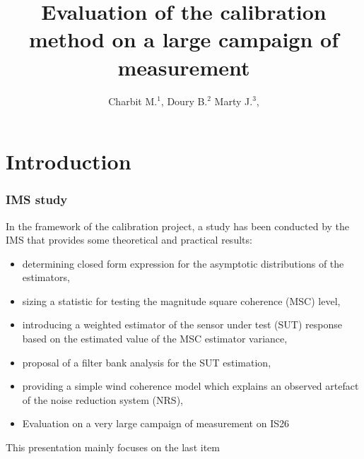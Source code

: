 \documentclass[handout,10pt]{beamer}
\title{Evaluation of the calibration method on a large campaign of measurement}
\author{
 Charbit M.$^{1}$, 
 Doury B.$^{2}$
 Marty J.$^{3}$,
}
\begin{document}
 \sloppy

\begin{frame}
\maketitle
\end{frame}


 \section{Introduction}
\begin{frame}
 \frametitle{IMS study}
 In the framework of the calibration project, a study has been conducted by the 
 IMS that provides some theoretical and practical results:
 \begin{itemize}
 \item
 determining closed form expression for the asymptotic distributions of the estimators,
 \item
sizing a statistic for testing  the magnitude square coherence (MSC) level,
 \item
 introducing a weighted estimator of the sensor under test (SUT) response based on the estimated value of the MSC estimator variance,
 \item
 proposal of a filter bank analysis for the SUT estimation,
 \item
 providing a simple wind coherence model which explains an observed artefact of the noise reduction system (NRS),
 \item
{\color{red} Evaluation on a very large campaign of measurement on IS26}
 \end{itemize}
 
  \bigskip
  
This presentation mainly focuses on the last item
 
\end{frame}
\end{document}
